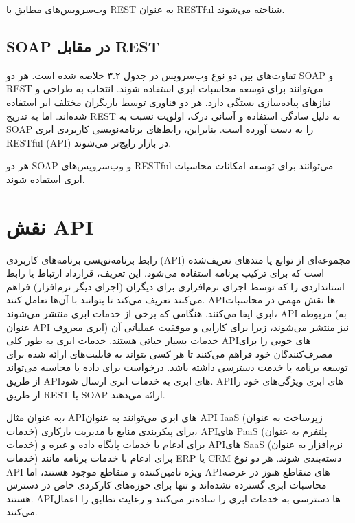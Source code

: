 \documentclass{book}
\begin{document}
            \begin{addinfo}
                وب‌سرویس‌های مطابق با REST به عنوان RESTful شناخته می‌شوند.
            \end{addinfo}

            \subsection{SOAP در مقابل REST}

            تفاوت‌های بین دو نوع وب‌سرویس در جدول ۳.۲ خلاصه شده است. هر دو SOAP و REST می‌توانند برای توسعه محاسبات ابری استفاده شوند. انتخاب به طراحی و نیازهای پیاده‌سازی بستگی دارد. هر دو فناوری توسط بازیگران مختلف ابر استفاده شده‌اند. اما به تدریج REST به دلیل سادگی استفاده و آسانی درک، اولویت نسبت به SOAP را به دست آورده است. بنابراین، رابط‌های برنامه‌نویسی کاربردی ابری RESTful (API) در بازار رایج‌تر می‌شوند.

            \begin{addinfo}
                هر دو SOAP و وب‌سرویس‌های RESTful می‌توانند برای توسعه امکانات محاسبات ابری استفاده شوند.
            \end{addinfo}

            \section{نقش API}
            
            رابط برنامه‌نویسی برنامه‌های کاربردی (API) مجموعه‌ای از توابع یا متدهای تعریف‌شده است که برای ترکیب برنامه استفاده می‌شود. این تعریف، قرارداد ارتباط یا رابط استانداردی را که توسط اجزای نرم‌افزاری برای دیگران (اجزای دیگر نرم‌افزار) فراهم می‌کنند تعریف می‌کند تا بتوانند با آن‌ها تعامل کنند. API‌ها نقش مهمی در محاسبات ابری ایفا می‌کنند. هنگامی که برخی از خدمات ابری منتشر می‌شوند، API مربوطه (به عنوان API ابری معروف) نیز منتشر می‌شوند، زیرا برای کارایی و موفقیت عملیاتی آن خدمات بسیار حیاتی هستند. خدمات ابری به طور کلی API‌های خوبی را برای مصرف‌کنندگان خود فراهم می‌کنند تا هر کسی بتواند به قابلیت‌های ارائه شده برای توسعه برنامه یا خدمت دسترسی داشته باشد. درخواست برای داده یا محاسبه می‌تواند از طریق API‌های ابری به خدمات ابری ارسال شود. API‌های ابری ویژگی‌های خود را از طریق REST یا SOAP ارائه می‌دهند.

            به عنوان مثال، API‌های ابری می‌توانند به عنوان API IaaS (زیرساخت به عنوان خدمات) برای پیکربندی منابع یا مدیریت بارکاری، API‌های PaaS (پلتفرم به عنوان خدمات) برای ادغام با خدمات پایگاه داده و غیره و API‌های SaaS (نرم‌افزار به عنوان خدمات) برای ادغام با خدمات برنامه مانند ERP یا CRM دسته‌بندی شوند. هر دو نوع API ویژه تامین‌کننده و متقاطع موجود هستند، اما API‌های متقاطع هنوز در عرصه محاسبات ابری گسترده نشده‌اند و تنها برای حوزه‌های کارکردی خاص در دسترس هستند. API‌ها دسترسی به خدمات ابری را ساده‌تر می‌کنند و رعایت تطابق را اعمال می‌کنند.
\end{document}
